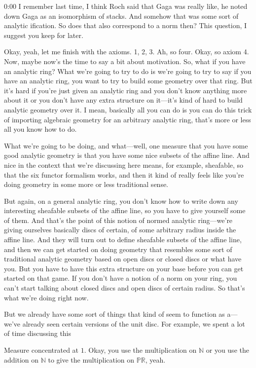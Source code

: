 \begin{unfinished}{0:00}
I remember last time, I think Roch said that Gaga was really like, he noted down Gaga as an isomorphism of stacks. And somehow that was some sort of analytic ification. So does that also correspond to a norm then? This question, I suggest you keep for later.

Okay, yeah, let me finish with the axioms. 1, 2, 3. Ah, so four. Okay, so axiom 4. Now, maybe now's the time to say a bit about motivation. So, what if you have an analytic ring? What we're going to try to do is we're going to try to say if you have an analytic ring, you want to try to build some geometry over that ring. But it's hard if you're just given an analytic ring and you don't know anything more about it or you don't have any extra structure on it---it's kind of hard to build analytic geometry over it. I mean, basically all you can do is you can do this trick of importing algebraic geometry for an arbitrary analytic ring, that's more or less all you know how to do.

What we're going to be doing, and what---well, one measure that you have some good analytic geometry is that you have some nice subsets of the affine line. And nice in the context that we're discussing here means, for example, sheafable, so that the six functor formalism works, and then it kind of really feels like you're doing geometry in some more or less traditional sense. 

But again, on a general analytic ring, you don't know how to write down any interesting sheafable subsets of the affine line, so you have to give yourself some of them. And that's the point of this notion of normed analytic ring---we're giving ourselves basically discs of certain, of some arbitrary radius inside the affine line. And they will turn out to define sheafable subsets of the affine line, and then we can get started on doing geometry that resembles some sort of traditional analytic geometry based on open discs or closed discs or what have you. But you have to have this extra structure on your base before you can get started on that game. If you don't have a notion of a norm on your ring, you can't start talking about closed discs and open discs of certain radius. So that's what we're doing right now.

But we already have some sort of things that kind of seem to function as a---we've already seen certain versions of the unit disc. For example, we spent a lot of time discussing this

Measure concentrated at $1$. Okay, you use the multiplication on $\mathbb{N}$ or you use the addition on $\mathbb{N}$ to give the multiplication on $\mathbb{PR}$, yeah.


\end{unfinished}
